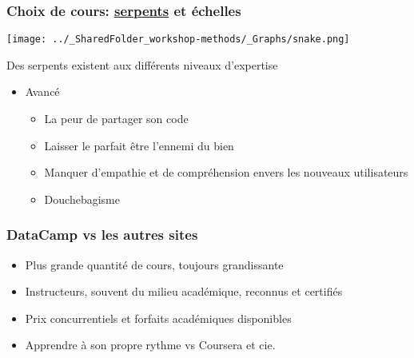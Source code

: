 \documentclass{beamer}
\begin{document}
    \begin{frame}
    
      \frametitle{Choix de cours: \uline{serpents} et échelles} \vspace{1cm}
      
        \begin{center}
        
          \texttt{[image: ../\_SharedFolder\_workshop-methods/\_Graphs/snake.png]}
         
        \end{center} 
        
  Des serpents existent aux différents niveaux d'expertise
      
    \begin{itemize}
        
      \item{Avancé}
        
          \begin{itemize}
            \item La peur de partager son code 
            \item Laisser le parfait être l’ennemi du bien
            \item Manquer d'empathie et de compréhension envers les nouveaux utilisateurs
            \item Douchebagisme

          \end{itemize}
        
        \end{itemize}
        
     \end{frame}
     
  

    \begin{frame}
    
      \frametitle{DataCamp vs les autres sites} \vspace{1cm}
      
        
        \begin{itemize}
          \item Plus grande quantité de cours, toujours grandissante 
          \item Instructeurs, souvent du milieu académique, reconnus et certifiés
          \item Prix concurrentiels et forfaits académiques disponibles
          \item Apprendre à son propre rythme vs Coursera et cie. 

        \end{itemize}
      
     \end{frame}
     
\end{document}
